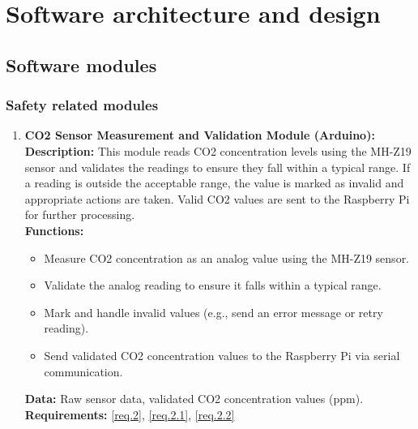 \section{Software architecture and design}
\label{chapter2}

\subsection{Software modules}

\subsubsection{Safety related modules}
\begin{enumerate}
    \item \textbf{CO2 Sensor Measurement and Validation Module (Arduino):} \\ 
        \textbf{Description:} This module reads CO2 concentration levels using the MH-Z19 sensor and validates the readings to ensure they fall within a typical range. If a reading is outside the acceptable range, the value is marked as invalid and appropriate actions are taken. Valid CO2 values are sent to the Raspberry Pi for further processing. \\ 
        \textbf{Functions:}
        \begin{itemize}
            \item Measure CO2 concentration as an analog value using the MH-Z19 sensor.
            \item Validate the analog reading to ensure it falls within a typical range.
            \item Mark and handle invalid values (e.g., send an error message or retry reading).
            \item Send validated CO2 concentration values to the Raspberry Pi via serial communication.
        \end{itemize}
        \textbf{Data:} Raw sensor data, validated CO2 concentration values (ppm). \\ 
        \textbf{Requirements:} \ref{req.2},  \ref{req.2.1}, \ref{req.2.2}\\


\end{enumerate}
